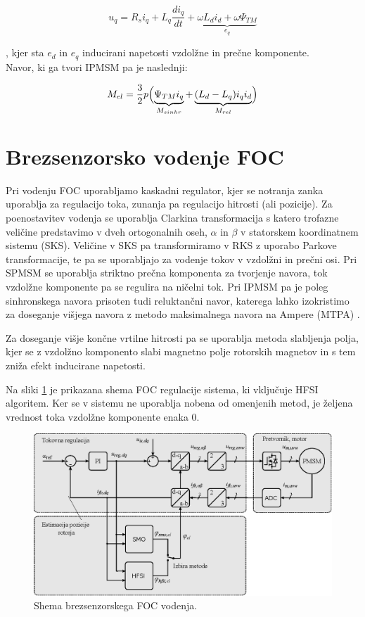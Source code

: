 \documentclass[a4paper,twoside,openright,12pt,slovene]{book}
\begin{document}
\begin{equation} \label{motorModelQ}
    u_q = R_si_q+L_q\frac{di_q}{dt}+\underbrace{\omega L_di_d + \omega\Psi_{TM}}_{e_q}
\end{equation}

, kjer sta $e_d$ in $e_q$ inducirani napetosti vzdolžne in prečne komponente.
\\
Navor, ki ga tvori IPMSM pa je naslednji:

\begin{equation}
    M_{el} = \frac{3}{2}p\Bigl(\underbrace{\Psi_{TM}i_q}_{M_{sinhr}}+\underbrace{(L_d-L_q)i_qi_d}_{M_{rel}}\Bigr)
\end{equation}



\section{Brezsenzorsko vodenje FOC}

Pri vodenju FOC uporabljamo kaskadni regulator, kjer se notranja zanka uporablja za regulacijo toka, zunanja pa regulacijo hitrosti (ali pozicije). Za poenostavitev vodenja se uporablja Clarkina
transformacija s katero trofazne veličine predstavimo v dveh ortogonalnih oseh, $\alpha$ in $\beta$ v statorskem koordinatnem sistemu (SKS). Veličine v SKS pa transformiramo v RKS z uporabo Parkove
transformacije, te pa se uporabljajo za vodenje tokov v vzdolžni in prečni osi. Pri SPMSM se uporablja striktno prečna komponenta za tvorjenje navora, tok vzdolžne komponente pa se regulira na ničelni
tok. Pri IPMSM pa je poleg sinhronskega navora prisoten tudi reluktančni navor, katerega lahko izokristimo za doseganje višjega navora z metodo maksimalnega navora na Ampere (MTPA)
\cite{ambrovzivc2016elektrivcni}.

Za doseganje višje končne vrtilne hitrosti pa se uporablja metoda slabljenja polja, kjer se z vzdolžno komponento slabi magnetno polje rotorskih magnetov in s tem zniža efekt inducirane
napetosti\cite{ambrovzivc2016elektrivcni}.

Na sliki \ref{FOCshema} je prikazana shema FOC regulacije sistema, ki vključuje HFSI algoritem. Ker se v sistemu ne uporablja nobena od omenjenih metod, je željena vrednost toka vzdolžne komponente enaka 0.

\begin{figure}[!htbp]
    \centering
    \includegraphics[width=0.75\columnwidth]{Slike/Inkscape/FOC.eps}
    \caption{\label{FOCshema} Shema brezsenzorskega FOC vodenja.}
\end{figure}
\end{document}
